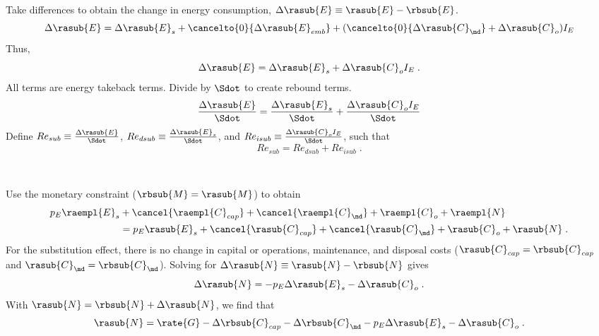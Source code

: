 \begin{landscape}
{Take differences to obtain the change in energy consumption, $\Delta \rasub{E} \equiv \rasub{E} - \rbsub{E}$.
%
\begin{equation}
  \Delta \rasub{E} = \Delta \rasub{E}_s 
                      + \cancelto{0}{\Delta \rasub{E}_{emb}} 
                      + (\cancelto{0}{\Delta \rasub{C}_{\md}} + \Delta \rasub{C}_o) I_E
\end{equation}
%
Thus, 
%
\begin{equation}
  \Delta \rasub{E} = \Delta \rasub{E}_s + \Delta \rasub{C}_o I_E \; .
\end{equation}
%
All terms are energy takeback terms.
Divide by $\Sdot$
to create rebound terms.
%
\begin{equation}
    \frac{\Delta \rasub{E}}{\Sdot} = \frac{\Delta \rasub{E}_s}{\Sdot} + \frac{\Delta \rasub{C}_o I_E}{\Sdot}
\end{equation}
%
Define 
$Re_{sub} \equiv \frac{\Delta \rasub{E}}{\Sdot}$, 
$Re_{dsub} \equiv \frac{\Delta \rasub{E}_s}{\Sdot}$, and
$Re_{isub} \equiv \frac{\Delta \rasub{C}_o I_E}{\Sdot}$,
such that
%
\begin{equation} \label{eq:Re_sub_def}
  Re_{sub} = Re_{dsub} + Re_{isub} \; .
\end{equation}

}
{
~
  
Use the monetary constraint ($\rbsub{M} = \rasub{M}$) to obtain
%
\begin{align}
  p_E \raempl{E}_s &+ \cancel{\raempl{C}_{cap}} + \cancel{\raempl{C}_{\md}} + \raempl{C}_o + \raempl{N} \nonumber \\
                   &= p_E \rasub{E}_s + \cancel{\rasub{C}_{cap}} + \cancel{\rasub{C}_{\md}} + \rasub{C}_o + \rasub{N} \; .
\end{align}
%
For the substitution effect, there is no change in capital or operations, maintenance, and disposal costs
($\rasub{C}_{cap} = \rbsub{C}_{cap}$ and $\rasub{C}_{\md} = \rbsub{C}_{\md}$).
Solving for $\Delta \rasub{N} \equiv \rasub{N} - \rbsub{N}$ gives
%
\begin{equation}
  \Delta \rasub{N} = - p_E \Delta \rasub{E}_s - \Delta \rasub{C}_o \; .
\end{equation}
%
With $\rasub{N} = \rbsub{N} + \Delta \rasub{N}$, 
we find that
%
\begin{equation} \label{eq:N_dot_after_sub}
  \rasub{N} = \rate{G} - \Delta \rbsub{C}_{cap} - \Delta \rbsub{C}_{\md} - p_E \Delta \rasub{E}_s - \Delta \rasub{C}_o \; .
\end{equation}
%
}

\end{landscape}
